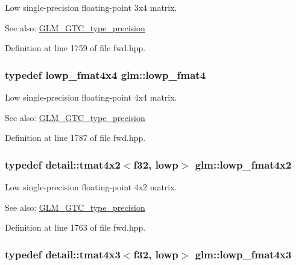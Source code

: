 Low single-precision floating-point 3x4 matrix. \begin{Desc}
\item[See also:]\hyperlink{group__gtc__type__precision}{GLM\_\-GTC\_\-type\_\-precision} \end{Desc}


Definition at line 1759 of file fwd.hpp.\hypertarget{group__gtc__type__precision_g00dfb85ec53bb5f173747f73d13c1b8b}{
\subsubsection[lowp\_\-fmat4]{\setlength{\rightskip}{0pt plus 5cm}typedef lowp\_\-fmat4x4 {\bf glm::lowp\_\-fmat4}}}
\label{group__gtc__type__precision_g00dfb85ec53bb5f173747f73d13c1b8b}


Low single-precision floating-point 4x4 matrix. \begin{Desc}
\item[See also:]\hyperlink{group__gtc__type__precision}{GLM\_\-GTC\_\-type\_\-precision} \end{Desc}


Definition at line 1787 of file fwd.hpp.\hypertarget{group__gtc__type__precision_g2433f92674e42eb6a75384fbab262306}{
\subsubsection[lowp\_\-fmat4x2]{\setlength{\rightskip}{0pt plus 5cm}typedef detail::tmat4x2$<$f32, lowp$>$ {\bf glm::lowp\_\-fmat4x2}}}
\label{group__gtc__type__precision_g2433f92674e42eb6a75384fbab262306}


Low single-precision floating-point 4x2 matrix. \begin{Desc}
\item[See also:]\hyperlink{group__gtc__type__precision}{GLM\_\-GTC\_\-type\_\-precision} \end{Desc}


Definition at line 1763 of file fwd.hpp.\hypertarget{group__gtc__type__precision_ga4df4f3adcc8eb3bed680b14a87fb2c4}{
\subsubsection[lowp\_\-fmat4x3]{\setlength{\rightskip}{0pt plus 5cm}typedef detail::tmat4x3$<$f32, lowp$>$ {\bf glm::lowp\_\-fmat4x3}}}
\label{group__gtc__type__precision_ga4df4f3adcc8eb3bed680b14a87fb2c4}


